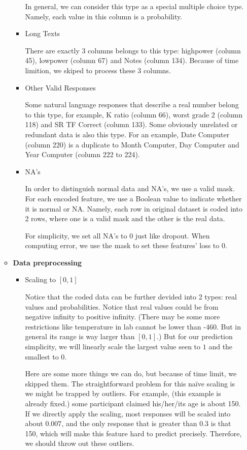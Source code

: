 \documentclass[11pt, a4paper]{article}
\makeatletter
\def\namedlabel#1#2{\begingroup
	\def\@currentlabel{#2}%
	\phantomsection\label{#1}\endgroup
}
\makeatother
\begin{document}
\begin{enumerate}
\begin{itemize}
\begin{itemize}
			\par{In general, we can consider this type as a special multiple choice type. Namely, each value in this column is a probability.}
			\item {Long Texts}
			\par{There are exactly 3 columns belongs to this type: highpower (column 45), lowpower (column 67) and Notes (column 134). Because of time limition, we skiped to process these 3 columns.}
			\item {Other Valid Responses}
			\par{Some natural language responses that describe a real number belong to this type, for example, K ratio (column 66), worst grade 2 (column 118) and SR TF Correct (column 133). Some obviously unrelated or redundant data is also this type. For an example, Date Computer (column 220) is a duplicate to Month Computer, Day Computer and Year Computer (column 222 to 224).}
			\item {NA's}
			\par{In order to distinguish normal data and NA's, we use a valid mask. For each encoded feature, we use a Boolean value to indicate whether it is normal or NA. Namely, each row in original dataset is coded into 2 rows, where one is a valid mask and the other is the real data.}
			\par{For simplicity, we set all NA’s to 0 just like dropout. When computing error, we use the mask to set these features’ loss to 0.}
		\end{itemize}
		\item {\textbf{Data preprocessing}}
		\namedlabel{preprocessing}{Data preprocessing}
		\begin{itemize}
			\item {Scaling to $[0, 1]$}
			\par{Notice that the coded data can be further devided into 2 types: real values and probabilities. Notice that real values could be from negative infinity to positive infinity. (There may be some more restrictions like temperature in lab cannot be lower than -460. But in general its range is way larger than $[0, 1]$.) But for our prediction simplicity, we will linearly scale the largest value seen to $1$ and the smallest to $0$.}
			\par{Here are some more things we can do, but because of time limit, we skipped them. The straightforward problem for this naïve scaling is we might be trapped by outliers. For example, (this example is already fixed.) some participant claimed his/her/its age is about 150. If we directly apply the scaling, most  responses will be scaled into about $0.007$, and the only response that is greater than $0.3$ is that 150, which will make this feature hard to predict precisely. Therefore, we should throw out these outliers.}

\end{itemize}
\end{itemize}
\end{enumerate}
\end{document}
